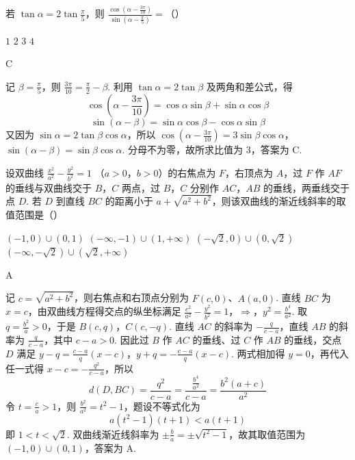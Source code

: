 \begin{problem}
若 \(\tan \alpha = 2\tan \frac{\pi}{5}\)，则 \(\frac{\cos\left(\alpha - \frac{3\pi}{10}\right)}{\sin\left(\alpha - \frac{\pi}{5}\right)} =\)（\quad）

\choices
    {\(1\)}
    {\(2\)}
    {\(3\)}
    {\(4\)}

\begin{answer}
C
\end{answer}

\begin{solution}
记 \(\beta=\frac\pi5\)，则 \(\frac{3\pi}{10}=\frac\pi2-\beta\). 利用 \(\tan\alpha=2\tan\beta\) 及两角和差公式，得
\[
\cos\left(\alpha-\frac{3\pi}{10}\right)=\cos\alpha\sin\beta+\sin\alpha\cos\beta
\]
\[
\sin\left(\alpha-\beta\right)=\sin\alpha\cos\beta-\cos\alpha\sin\beta
\]
又因为 \(\sin\alpha=2\tan\beta\cos\alpha\)，所以
\(\cos\left(\alpha-\frac{3\pi}{10}\right)=3\sin\beta\cos\alpha\)，\(\sin\left(\alpha-\beta\right)=\sin\beta\cos\alpha\).
分母不为零，故所求比值为 \(3\)，答案为 C.
\end{solution}
\end{problem}

\begin{problem}
设双曲线 \(\frac{x^2}{a^2} - \frac{y^2}{b^2} = 1 \) （\(a > 0\)，\(b > 0\)）的右焦点为 \(F\)，右顶点为 \(A\)，过 \(F\) 作 \(AF\) 的垂线与双曲线交于 \(B\)，\(C\) 两点，过 \(B\)，\(C\) 分别作 \(AC\)，\(AB\) 的垂线，两垂线交于点 \(D\). 若 \(D\) 到直线 \(BC\) 的距离小于 \(a + \sqrt{a^2 + b^2}\)，则该双曲线的渐近线斜率的取值范围是（\quad）

\choices
    {\((-1,0)\cup (0,1)\)}
    {\((-\infty, -1) \cup (1, +\infty)\)}
    {\((-\sqrt{2}, 0) \cup (0, \sqrt{2})\)}
    {\((-\infty, -\sqrt{2}) \cup (\sqrt{2}, +\infty)\)}

\begin{answer}
A
\end{answer}

\begin{solution}
记 \(c=\sqrt{a^2+b^2}\)，则右焦点和右顶点分别为 \(F(c,0)\)、\(A(a,0)\). 直线 \(BC\) 为 \(x=c\)，由双曲线方程得交点的纵坐标满足
\(\frac{c^2}{a^2}-\frac{y^2}{b^2}=1\)，\(\Longrightarrow\)，\(y^2=\frac{b^4}{a^2}\).
取 \(q=\frac{b^2}{a}>0\)，于是
\(B(c,q)\)，\(C(c,-q)\).
直线 \(AC\) 的斜率为 \(-\frac{q}{c-a}\)，直线 \(AB\) 的斜率为 \(\frac{q}{c-a}\)，其中 \(c-a>0\). 因此过 \(B\) 作 \(AC\) 的垂线、过 \(C\) 作 \(AB\) 的垂线，交点 \(D\) 满足
\(y-q=\frac{c-a}{q}(x-c)\)，\(y+q=-\frac{c-a}{q}(x-c)\).
两式相加得 \(y=0\)，再代入任一式得 \(x-c=-\frac{q^2}{c-a}\)，所以
\[
d(D,BC)=\frac{q^2}{c-a}=\frac{\frac{b^4}{a^2}}{c-a}=\frac{b^2(a+c)}{a^2}
\]
令 \(t=\frac ca>1\)，则 \(\frac{b^2}{a^2}=t^2-1\)，题设不等式化为
\[
a(t^2-1)(t+1)<a(t+1)
\]
即 \(1<t<\sqrt2\). 双曲线渐近线斜率为 \(\pm\frac ba=\pm\sqrt{t^2-1}\)，故其取值范围为 \((-1,0)\cup(0,1)\)，答案为 A.
\end{solution}
\end{problem}

